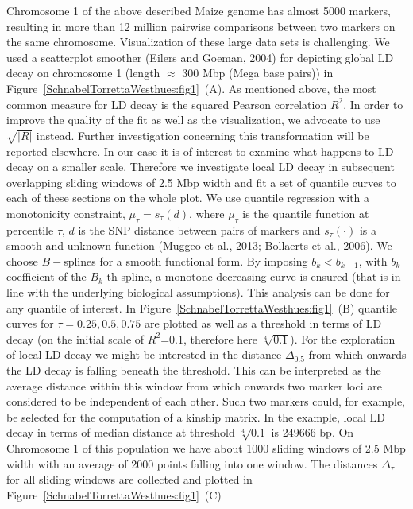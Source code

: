 \documentclass[twoside]{report}
\begin{document}
Chromosome 1 of the above described 
Maize genome has almost 5000 markers, resulting in more than 
12 million pairwise comparisons 
	between two markers on the same chromosome. Visualization of these large data sets is 
	challenging. We used a scatterplot smoother (Eilers and Goeman, 2004) for depicting
	global LD decay on chromosome 1 (length $\approx$ 300 Mbp (Mega base pairs))   
	in Figure~\ref{SchnabelTorrettaWesthues:fig1}~(A). As mentioned above, the most 
	common measure for LD decay is the squared Pearson correlation $R^2$. In order to improve the 
	quality of the fit as well as the visualization, we advocate to use $\sqrt{|R|}$ instead. Further 
	investigation concerning this transformation will be reported elsewhere. 
	In our case it is of interest to examine what happens to 
	LD decay on a smaller scale. Therefore we investigate local LD decay in subsequent 
	overlapping sliding windows of 2.5 Mbp width and fit a set of quantile curves to each of these 
	sections on the whole plot.  
	We use quantile 
	regression with a monotonicity constraint,
	$\mu_{\tau}=s_{\tau}(d)$, where $\mu_\tau$ is the quantile function at 
	percentile $\tau$, $d$ is the SNP distance between pairs of markers and 
	$s_{\tau}(\cdot)$ is a smooth and unknown function (Muggeo et al., 2013; Bollaerts et al., 2006). 
	We choose $B-$splines for a smooth functional form. By imposing 
	$b_k<b_{k-1}$, with $b_{k}$ coefficient of the $B_k$-th spline, 
	a monotone decreasing curve is ensured (that is 
	in line with the underlying biological assumptions). This analysis can be done for any quantile 
	of interest. In Figure~\ref{SchnabelTorrettaWesthues:fig1}~(B) quantile curves for 
	$\tau={0.25,0.5,0.75}$ are 
	plotted as well as a threshold in terms of LD decay (on the initial scale 
	of $R^2$=0.1, therefore here $\sqrt[4]{0.1}$). For the exploration of local LD decay 
	we might be interested in the distance $\Delta_{0.5}$ from 
	which onwards the LD decay is falling beneath the threshold. This can be interpreted as the
	average distance within this window from which onwards two marker loci are considered to be 
	independent of each other. Such two markers could, for example, be selected for the computation
	of a kinship matrix. In the example, local 
		LD decay in terms of median distance at threshold $\sqrt[4]{0.1}$ is 249666 bp. 
	On Chromosome 1 of this population we have about 1000 sliding windows
	 of 2.5 Mbp width with an 
	average of 2000 points falling into one window. The distances 
	$\Delta_{\tau}$ for all sliding windows are collected and plotted 
	in Figure~\ref{SchnabelTorrettaWesthues:fig1}~(C) 
\end{document}
